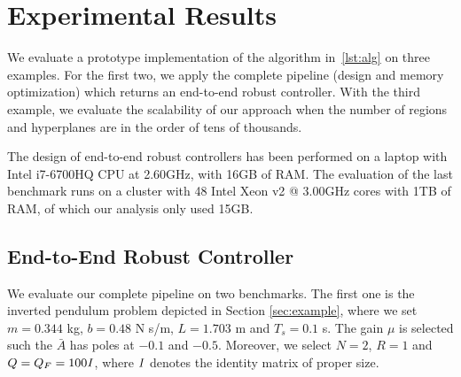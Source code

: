 \section{Experimental Results}\label{sec:experiments}



We evaluate a prototype implementation of the algorithm in~\autoref{lst:alg}
on three examples. For the first two, we apply the complete pipeline (design and memory optimization)
which returns an end-to-end robust controller. With the third example, we evaluate
the scalability of our approach when the number of regions and hyperplanes are in
the order of tens of thousands.


The design of end-to-end robust controllers has been performed on a laptop with Intel i7-6700HQ CPU at
2.60GHz, with 16GB of RAM. The evaluation of the last benchmark runs on a
cluster with 48 Intel Xeon v2 @ 3.00GHz cores with 1TB of RAM, of which our analysis
only used 15GB.

\subsection{End-to-End Robust Controller}

We evaluate our complete pipeline on two benchmarks. 
The first one is the inverted pendulum problem depicted in Section \ref{sec:example}, where we set
$m=0.344$ kg, $b=0.48$ N s/m, $L=1.703$ m and $T_s=0.1$ s. The gain $\mu$ is
selected such the $\bar A$ has poles at $-0.1$ and $-0.5$. Moreover, we select
$N=2$, $R=1$ and $Q=Q_F=100\mathbf{\it I}$, where $\mathbf{ \it I}$ denotes the
identity matrix of proper size. 

